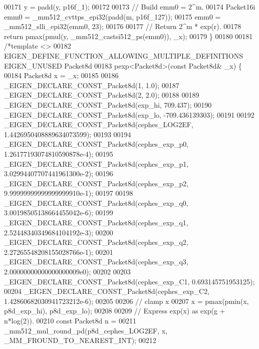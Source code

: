 \begin{DoxyCode}
00171   y = padd(y, p16f\_1);
00172 
00173   \textcolor{comment}{// Build emm0 = 2^m.}
00174   Packet16i emm0 = \_mm512\_cvttps\_epi32(padd(m, p16f\_127));
00175   emm0 = \_mm512\_slli\_epi32(emm0, 23);
00176 
00177   \textcolor{comment}{// Return 2^m * exp(r).}
00178   \textcolor{keywordflow}{return} pmax(pmul(y, \_mm512\_castsi512\_ps(emm0)), \_x);
00179 \}
00180 
00181 \textcolor{comment}{/*template <>}
00182 \textcolor{comment}{EIGEN\_DEFINE\_FUNCTION\_ALLOWING\_MULTIPLE\_DEFINITIONS EIGEN\_UNUSED Packet8d}
00183 \textcolor{comment}{pexp<Packet8d>(const Packet8d& \_x) \{}
00184 \textcolor{comment}{  Packet8d x = \_x;}
00185 \textcolor{comment}{}
00186 \textcolor{comment}{  \_EIGEN\_DECLARE\_CONST\_Packet8d(1, 1.0);}
00187 \textcolor{comment}{  \_EIGEN\_DECLARE\_CONST\_Packet8d(2, 2.0);}
00188 \textcolor{comment}{}
00189 \textcolor{comment}{  \_EIGEN\_DECLARE\_CONST\_Packet8d(exp\_hi, 709.437);}
00190 \textcolor{comment}{  \_EIGEN\_DECLARE\_CONST\_Packet8d(exp\_lo, -709.436139303);}
00191 \textcolor{comment}{}
00192 \textcolor{comment}{  \_EIGEN\_DECLARE\_CONST\_Packet8d(cephes\_LOG2EF, 1.4426950408889634073599);}
00193 \textcolor{comment}{}
00194 \textcolor{comment}{  \_EIGEN\_DECLARE\_CONST\_Packet8d(cephes\_exp\_p0, 1.26177193074810590878e-4);}
00195 \textcolor{comment}{  \_EIGEN\_DECLARE\_CONST\_Packet8d(cephes\_exp\_p1, 3.02994407707441961300e-2);}
00196 \textcolor{comment}{  \_EIGEN\_DECLARE\_CONST\_Packet8d(cephes\_exp\_p2, 9.99999999999999999910e-1);}
00197 \textcolor{comment}{}
00198 \textcolor{comment}{  \_EIGEN\_DECLARE\_CONST\_Packet8d(cephes\_exp\_q0, 3.00198505138664455042e-6);}
00199 \textcolor{comment}{  \_EIGEN\_DECLARE\_CONST\_Packet8d(cephes\_exp\_q1, 2.52448340349684104192e-3);}
00200 \textcolor{comment}{  \_EIGEN\_DECLARE\_CONST\_Packet8d(cephes\_exp\_q2, 2.27265548208155028766e-1);}
00201 \textcolor{comment}{  \_EIGEN\_DECLARE\_CONST\_Packet8d(cephes\_exp\_q3, 2.00000000000000000009e0);}
00202 \textcolor{comment}{}
00203 \textcolor{comment}{  \_EIGEN\_DECLARE\_CONST\_Packet8d(cephes\_exp\_C1, 0.693145751953125);}
00204 \textcolor{comment}{  \_EIGEN\_DECLARE\_CONST\_Packet8d(cephes\_exp\_C2, 1.42860682030941723212e-6);}
00205 \textcolor{comment}{}
00206 \textcolor{comment}{  // clamp x}
00207 \textcolor{comment}{  x = pmax(pmin(x, p8d\_exp\_hi), p8d\_exp\_lo);}
00208 \textcolor{comment}{}
00209 \textcolor{comment}{  // Express exp(x) as exp(g + n*log(2)).}
00210 \textcolor{comment}{  const Packet8d n =}
00211 \textcolor{comment}{      \_mm512\_mul\_round\_pd(p8d\_cephes\_LOG2EF, x, \_MM\_FROUND\_TO\_NEAREST\_INT);}
00212 \textcolor{comment}{}

\end{DoxyCode}
